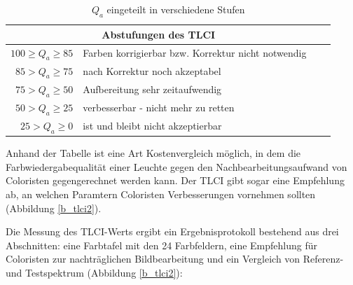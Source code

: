 	\begin{table}[htp] 
		\centering
		\begin{tabular}{rlcc}  %
		\toprule
		\multicolumn{2}{c}{\large\sffamily Abstufungen des TLCI}\\ 							
		\midrule
		$100 \geq  Q_{a} \geq 85$  & Farben korrigierbar bzw. Korrektur nicht notwendig\\ 
		$85 > Q_{a} \geq 75$ & nach Korrektur noch akzeptabel\\
		$75 > Q_{a} \geq 50$ & Aufbereitung sehr zeitaufwendig\\
		$50 > Q_{a} \geq 25$ & verbesserbar - nicht mehr zu retten\\
		$25 > Q_{a} \geq 0$ & ist und bleibt nicht akzeptierbar\\
		\bottomrule
		\end{tabular}
		\caption{$Q_{a}$ eingeteilt in verschiedene Stufen\protect\footnotemark}	
		\label{t_tlci}
	\end{table}
\noindent Anhand der Tabelle ist eine Art Kostenvergleich möglich, in dem die Farbwiedergabequalität einer Leuchte gegen den Nachbearbeitungsaufwand von Coloristen gegengerechnet werden kann. Der TLCI gibt sogar eine Empfehlung ab, an welchen Paramtern Coloristen Verbesserungen vornehmen sollten (Abbildung \ref{b_tlci2}).\newpage 

\noindent Die Messung des TLCI-Werts ergibt ein Ergebnisprotokoll bestehend aus drei Abschnitten: eine Farbtafel mit den 24 Farbfeldern, eine Empfehlung für Coloristen zur nachträglichen Bildbearbeitung und ein Vergleich von Referenz- und Testspektrum (Abbildung \ref{b_tlci2}):\\ 

